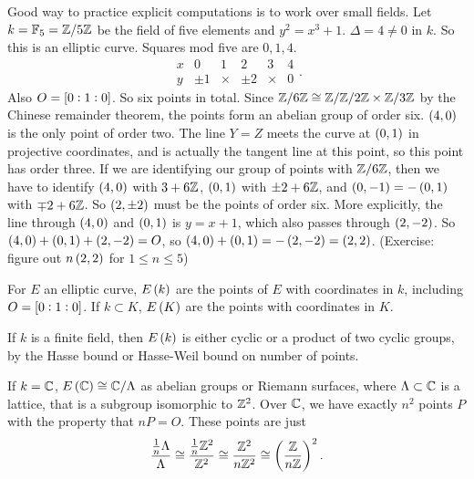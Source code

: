 \begin{example*}
Good way to practice explicit computations is to work over small fields. Let $ k = \mathbb{F}_5 = \mathbb{Z} / 5\mathbb{Z} $ be the field of five elements and $ y^2 = x^3 + 1 $. $ \Delta = 4 \ne 0 $ in $ k $. So this is an elliptic curve. Squares mod five are $ 0, 1, 4 $.
$$
\begin{array}{c|ccccc}
x & 0 & 1 & 2 & 3 & 4 \\
\hline
y & \pm 1 & \times & \pm 2 & \times & 0
\end{array}.
$$
Also $ O = \sbr{0 : 1 : 0} $. So six points in total. Since $ \mathbb{Z} / 6\mathbb{Z} \cong \mathbb{Z} / \mathbb{Z} / 2\mathbb{Z} \times \mathbb{Z} / 3\mathbb{Z} $ by the Chinese remainder theorem, the points form an abelian group of order six. $ \br{4, 0} $ is the only point of order two. The line $ Y = Z $ meets the curve at $ \br{0, 1} $ in projective coordinates, and is actually the tangent line at this point, so this point has order three. If we are identifying our group of points with $ \mathbb{Z} / 6\mathbb{Z} $, then we have to identify $ \br{4, 0} $ with $ 3 + 6\mathbb{Z} $, $ \br{0, 1} $ with $ \pm 2 + 6\mathbb{Z} $, and $ \br{0, -1} = -\br{0, 1} $ with $ \mp 2 + 6\mathbb{Z} $. So $ \br{2, \pm 2} $ must be the points of order six. More explicitly, the line through $ \br{4, 0} $ and $ \br{0, 1} $ is $ y = x + 1 $, which also passes through $ \br{2, -2} $. So $ \br{4, 0} + \br{0, 1} + \br{2, -2} = O $, so $ \br{4, 0} + \br{0, 1} = -\br{2, -2} = \br{2, 2} $. (Exercise: figure out $ n\br{2, 2} $ for $ 1 \le n \le 5 $)
\end{example*}

For $ E $ an elliptic curve, $ E\br{k} $ are the points of $ E $ with coordinates in $ k $, including $ O = \sbr{0 : 1 : 0} $. If $ k \subset K $, $ E\br{K} $ are the points with coordinates in $ K $.

\begin{example*}
If $ k $ is a finite field, then $ E\br{k} $ is either cyclic or a product of two cyclic groups, by the Hasse bound or Hasse-Weil bound on number of points.
\end{example*}

\begin{example*}
If $ k = \mathbb{C} $, $ E\br{\C} \cong \C / \Lambda $ as abelian groups or Riemann surfaces, where $ \Lambda \subset \mathbb{C} $ is a lattice, that is a subgroup isomorphic to $ \mathbb{Z}^2 $. Over $ \mathbb{C} $, we have exactly $ n^2 $ points $ P $ with the property that $ nP = O $. These points are just
$$ \dfrac{\tfrac{1}{n}\Lambda}{\Lambda} \cong \dfrac{\tfrac{1}{n}\Z^2}{\Z^2} \cong \dfrac{\Z^2}{n\Z^2} \cong \br{\dfrac{\Z}{n\Z}}^2. $$
\end{example*}

